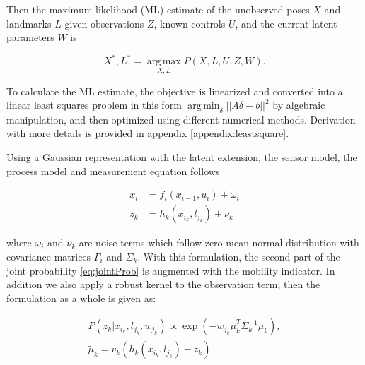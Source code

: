 Then the maximum likelihood (ML) estimate of the unobserved poses $X$ and landmarks $L$ given observations $Z$, known controls $U$, and the current latent parameters $W$ is

\begin{equation}
X^*, L^* = \operatorname*{arg\,max}_{X,L} P(X,L,U,Z,W).
\end{equation}

To calculate the ML estimate, the objective is linearized and converted into a linear least
squares problem in this form $\operatorname*{arg\,min}_{\delta} || A
\delta  - b ||^2$ by algebraic manipulation, and then optimized using
different numerical methods. Derivation with more details is provided in appendix \ref{appendix:leastsquare}.

Using a Gaussian representation with the latent extension, the sensor
model, the process model and measurement equation follows

\begin{equation}
\begin{aligned}
x_i &= f_i(x_{i-1}, u_i) + \omega_i \\
z_k &= h_k(x_{i_k}, l_{j_k}) + \nu_k
\end{aligned}
\label{eq:gaussRepresentation}
\end{equation}

where $\omega_i$ and $\nu_k$ are noise terms which follow zero-mean normal distribution with covariance matrices $\Gamma_i$ and $\Sigma_k$. With this formulation, the second part of the joint probability \ref{eq:jointProb} is augmented with the mobility indicator. In addition we also apply a robust kernel to the observation term, then the formulation as a whole is given as:

\begin{equation}
\begin{aligned}
P(z_k|x_{i_k}, l_{j_k}, w_{j_k})\propto \exp(-w_{j_k} \tilde{\mu}_k^T \Sigma_k^{-1} \tilde{\mu}_k),\\
 \tilde{\mu}_k = v_k(h_k(x_{i_k}, l_{j_k}) - z_k)
\label{eq:sensor}
\end{aligned}
\end{equation}

